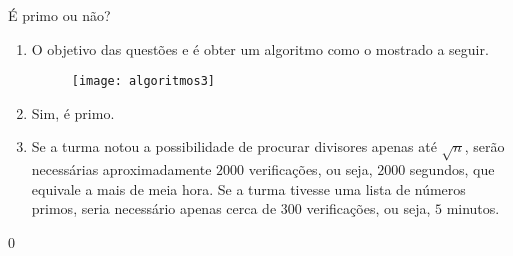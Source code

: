 \begin{answer}{É primo ou não?}
{
\begin{enumerate}
\item O objetivo das questões  e  é obter um algoritmo como o mostrado a seguir.

\begin{figure}[H]
\centering

\texttt{[image: algoritmos3]}
\end{figure}

\item Sim, é primo.

\item Se a turma notou a possibilidade de procurar divisores apenas até $\sqrt{n}$, serão necessárias aproximadamente $2000$ verificações, ou seja, $2000$ segundos, que equivale a mais de meia hora. Se a turma tivesse uma lista de números primos, seria necessário apenas cerca de $300$ verificações, ou seja, $5$ minutos.
\end{enumerate}
}{0}
\end{answer}
\clearmargin

